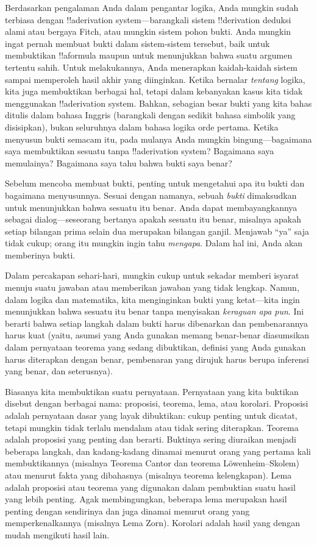 \documentclass[../../../include/open-logic-section]{subfiles}
\begin{document}


Berdasarkan pengalaman Anda dalam pengantar logika, Anda mungkin
sudah terbiasa dengan !!a{derivation} system---barangkali sistem
!!{derivation} deduksi alami atau bergaya Fitch, atau mungkin sistem
pohon bukti. Anda mungkin ingat pernah membuat bukti dalam sistem-sistem
tersebut, baik untuk membuktikan !!a{formula} maupun untuk menunjukkan
bahwa suatu argumen tertentu sahih. Untuk melakukannya, Anda
menerapkan kaidah-kaidah sistem sampai memperoleh hasil akhir yang
diinginkan. Ketika bernalar \emph{tentang} logika, kita juga membuktikan
berbagai hal, tetapi dalam kebanyakan kasus kita tidak menggunakan
!!a{derivation} system. Bahkan, sebagian besar bukti yang kita bahas
ditulis dalam bahasa Inggris (barangkali dengan sedikit bahasa
simbolik yang disisipkan), bukan seluruhnya dalam bahasa logika orde
pertama. Ketika menyusun bukti semacam itu, pada mulanya Anda mungkin
bingung---bagaimana saya membuktikan sesuatu tanpa !!a{derivation}
system? Bagaimana saya memulainya? Bagaimana saya tahu bahwa bukti saya
benar?

Sebelum mencoba membuat bukti, penting untuk mengetahui apa itu bukti
dan bagaimana menyusunnya. Sesuai dengan namanya, sebuah \emph{bukti}
dimaksudkan untuk menunjukkan bahwa sesuatu itu benar. Anda dapat
membayangkannya sebagai dialog---seseorang bertanya apakah sesuatu itu
benar, misalnya apakah setiap bilangan prima selain dua merupakan
bilangan ganjil. Menjawab ``ya'' saja tidak cukup; orang itu mungkin
ingin tahu \emph{mengapa}. Dalam hal ini, Anda akan memberinya bukti.

Dalam percakapan sehari-hari, mungkin cukup untuk sekadar memberi
isyarat menuju suatu jawaban atau memberikan jawaban yang tidak
lengkap. Namun, dalam logika dan matematika, kita menginginkan bukti
yang ketat---kita ingin menunjukkan bahwa sesuatu itu benar tanpa
menyisakan \emph{keraguan apa pun}. Ini berarti bahwa setiap langkah
dalam bukti harus dibenarkan dan pembenarannya harus kuat (yaitu,
asumsi yang Anda gunakan memang benar-benar diasumsikan dalam
pernyataan teorema yang sedang dibuktikan, definisi yang Anda gunakan
harus diterapkan dengan benar, pembenaran yang dirujuk harus berupa
inferensi yang benar, dan seterusnya).

Biasanya kita membuktikan suatu pernyataan. Pernyataan yang kita
buktikan disebut dengan berbagai nama: proposisi, teorema, lema, atau
korolari. Proposisi adalah pernyataan dasar yang layak dibuktikan:
cukup penting untuk dicatat, tetapi mungkin tidak terlalu mendalam
atau tidak sering diterapkan. Teorema adalah proposisi yang penting
dan berarti. Buktinya sering diuraikan menjadi beberapa langkah, dan
kadang-kadang dinamai menurut orang yang pertama kali membuktikannya
(misalnya Teorema Cantor dan teorema L\"owenheim--Skolem) atau menurut
fakta yang dibahasnya (misalnya teorema kelengkapan). Lema adalah
proposisi atau teorema yang digunakan dalam pembuktian suatu hasil
yang lebih penting. Agak membingungkan, beberapa lema merupakan hasil
penting dengan sendirinya dan juga dinamai menurut orang yang
memperkenalkannya (misalnya Lema Zorn). Korolari adalah hasil yang
dengan mudah mengikuti hasil lain.
\end{document}
